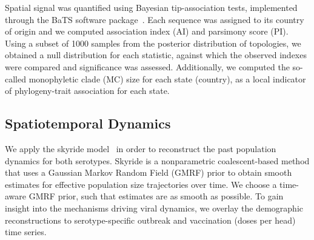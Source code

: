 \documentclass[10pt]{article}
\begin{document}
Spatial signal was quantified using Bayesian tip-association tests, implemented through the BaTS software package~\cite{bats}.
Each sequence was assigned to its country of origin and we computed association index (AI) and parsimony score (PI).
Using a subset of 1000 samples from the posterior distribution of topologies, we obtained a null distribution for each statistic, against which the observed indexes were compared and significance was assessed.
Additionally, we computed the so-called monophyletic clade (MC) size for each state (country), as a local indicator of phylogeny-trait association for each state.


\subsection*{Spatiotemporal Dynamics}

We apply the 
skyride model~\cite{skyride} in order to reconstruct the past population dynamics for both serotypes.
Skyride is a nonparametric coalescent-based method that uses a Gaussian Markov Random Field (GMRF) prior to obtain smooth estimates for effective population size trajectories over time.
We choose a time-aware GMRF prior, such that estimates are as smooth as possible.
To gain insight into the mechanisms driving viral dynamics, we overlay the demographic reconstructions to serotype-specific outbreak and vaccination (doses per head) time series.
\end{document}
